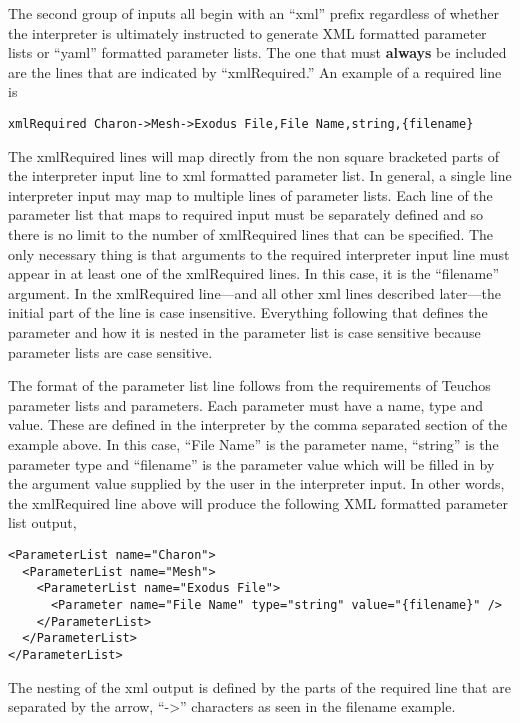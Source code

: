 The second group of inputs all begin with an ``xml'' prefix regardless
of whether the interpreter is ultimately instructed to generate XML
formatted parameter lists or ``yaml'' formatted parameter lists.  The
one that must {\bf always} be included are the lines that are
indicated by ``xmlRequired.''  An example of a required line is
\begin{lstlisting}
xmlRequired Charon->Mesh->Exodus File,File Name,string,{filename}
\end{lstlisting}
The xmlRequired lines will map directly from the non square bracketed
parts of the interpreter input line to xml formatted parameter list.
In general, a single line interpreter input may map to multiple lines
of parameter lists.  Each line of the parameter list that maps to
required input must be separately defined and so there is no limit to
the number of xmlRequired lines that can be specified.  The only
necessary thing is that arguments to the required interpreter input
line must appear in at least one of the xmlRequired lines.  In this
case, it is the ``filename'' argument.  In the xmlRequired line---and
all other xml lines described later---the initial part of the line is
case insensitive.  Everything following that defines the parameter and
how it is nested in the parameter list is case sensitive because
parameter lists are case sensitive.

The format of the parameter list line follows from the requirements of
Teuchos \cite{teuchosCitation} parameter lists and parameters.  Each
parameter must have a name, type and value.  These are defined in the
interpreter by the comma separated section of the example above.  In
this case, ``File Name'' is the parameter name, ``string'' is the
parameter type and ``{filename}'' is the parameter value which will be
filled in by the argument value supplied by the user in the
interpreter input.  In other words, the xmlRequired line above will
produce the following XML formatted parameter list output,
\begin{lstlisting}
<ParameterList name="Charon">
  <ParameterList name="Mesh">
    <ParameterList name="Exodus File">
      <Parameter name="File Name" type="string" value="{filename}" />
    </ParameterList>
  </ParameterList>
</ParameterList>
\end{lstlisting}

The nesting of the xml output is defined by the parts of the required
line that are separated by the arrow, ``->'' characters as seen in the
filename example.

